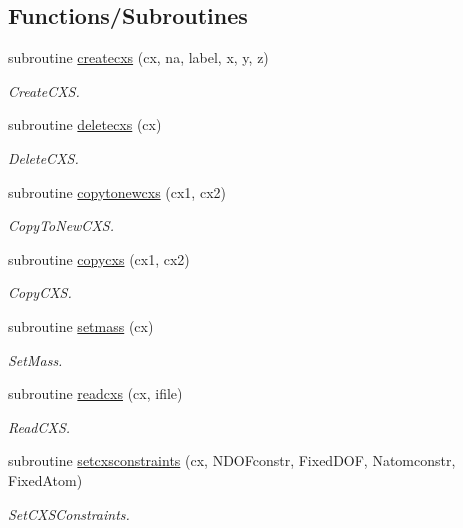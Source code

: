 \subsection*{Functions/\+Subroutines}
\begin{DoxyCompactItemize}
\item 
subroutine \mbox{\hyperlink{namespacechemstr_a816dc4c02e3f8a2fa1b2ce158044da9c}{createcxs}} (cx, na, label, x, y, z)
\begin{DoxyCompactList}\small\item\em Create\+C\+XS. \end{DoxyCompactList}\item 
subroutine \mbox{\hyperlink{namespacechemstr_a355e4ad635ef0c00ec0fd0f3dfcb5fe6}{deletecxs}} (cx)
\begin{DoxyCompactList}\small\item\em Delete\+C\+XS. \end{DoxyCompactList}\item 
subroutine \mbox{\hyperlink{namespacechemstr_a8e6c53cdedc7fd4344a6c7f80cef7ea8}{copytonewcxs}} (cx1, cx2)
\begin{DoxyCompactList}\small\item\em Copy\+To\+New\+C\+XS. \end{DoxyCompactList}\item 
subroutine \mbox{\hyperlink{namespacechemstr_a037cd002260a81e4cb610374dd2b5b91}{copycxs}} (cx1, cx2)
\begin{DoxyCompactList}\small\item\em Copy\+C\+XS. \end{DoxyCompactList}\item 
subroutine \mbox{\hyperlink{namespacechemstr_a56a273f4f5259b687492dbe0824baee7}{setmass}} (cx)
\begin{DoxyCompactList}\small\item\em Set\+Mass. \end{DoxyCompactList}\item 
subroutine \mbox{\hyperlink{namespacechemstr_aff042add3b3af6c94bbd1ab650c2d52d}{readcxs}} (cx, ifile)
\begin{DoxyCompactList}\small\item\em Read\+C\+XS. \end{DoxyCompactList}\item 
subroutine \mbox{\hyperlink{namespacechemstr_ac2d7e06af27d3d0883dd5e3cb31b4a51}{setcxsconstraints}} (cx, N\+D\+O\+Fconstr, Fixed\+D\+OF, Natomconstr, Fixed\+Atom)
\begin{DoxyCompactList}\small\item\em Set\+C\+X\+S\+Constraints. \end{DoxyCompactList}\item 

\end{DoxyCompactItemize}
